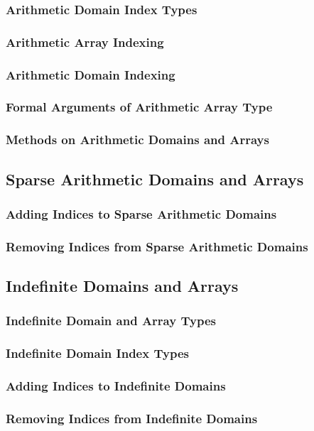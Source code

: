 \documentclass[10pt,twoside,titlepage]{article}
\begin{document}
\subsubsection{Arithmetic Domain Index Types}
\subsubsection{Arithmetic Array Indexing}
\subsubsection{Arithmetic Domain Indexing}
\subsubsection{Formal Arguments of Arithmetic Array Type}
\subsubsection{Methods on Arithmetic Domains and Arrays}
\subsection{Sparse Arithmetic Domains and Arrays}
\subsubsection{Adding Indices to Sparse Arithmetic Domains}
\subsubsection{Removing Indices from Sparse Arithmetic Domains}
\subsection{Indefinite Domains and Arrays}
\subsubsection{Indefinite Domain and Array Types}
\subsubsection{Indefinite Domain Index Types}
\subsubsection{Adding Indices to Indefinite Domains}
\subsubsection{Removing Indices from Indefinite Domains}
\end{document}
